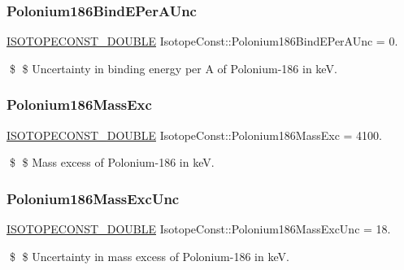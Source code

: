 \subsubsection{\texorpdfstring{Polonium186\+Bind\+E\+Per\+A\+Unc}{Polonium186BindEPerAUnc}}
{\footnotesize\ttfamily \mbox{\hyperlink{group___isotope_const-_macros_ga8f45a7272ce02c0b4c65c44636ed719a}{I\+S\+O\+T\+O\+P\+E\+C\+O\+N\+S\+T\+\_\+\+D\+O\+U\+B\+LE}} Isotope\+Const\+::\+Polonium186\+Bind\+E\+Per\+A\+Unc = 0.}

\$ \$ Uncertainty in binding energy per A of Polonium-\/186 in keV. \mbox{\label{group___isotope_const-_polonium-_po186_ga1b633674085603a2814ebd151571cde6}} 
\subsubsection{\texorpdfstring{Polonium186\+Mass\+Exc}{Polonium186MassExc}}
{\footnotesize\ttfamily \mbox{\hyperlink{group___isotope_const-_macros_ga8f45a7272ce02c0b4c65c44636ed719a}{I\+S\+O\+T\+O\+P\+E\+C\+O\+N\+S\+T\+\_\+\+D\+O\+U\+B\+LE}} Isotope\+Const\+::\+Polonium186\+Mass\+Exc = 4100.}

\$ \$ Mass excess of Polonium-\/186 in keV. \mbox{\label{group___isotope_const-_polonium-_po186_ga00297f0ab78b609fdad2ebc7a309b91a}} 
\subsubsection{\texorpdfstring{Polonium186\+Mass\+Exc\+Unc}{Polonium186MassExcUnc}}
{\footnotesize\ttfamily \mbox{\hyperlink{group___isotope_const-_macros_ga8f45a7272ce02c0b4c65c44636ed719a}{I\+S\+O\+T\+O\+P\+E\+C\+O\+N\+S\+T\+\_\+\+D\+O\+U\+B\+LE}} Isotope\+Const\+::\+Polonium186\+Mass\+Exc\+Unc = 18.}

\$ \$ Uncertainty in mass excess of Polonium-\/186 in keV. \mbox{\label{group___isotope_const-_polonium-_po186_gae7c9276374004f940f12468b48cf8baa}} 
